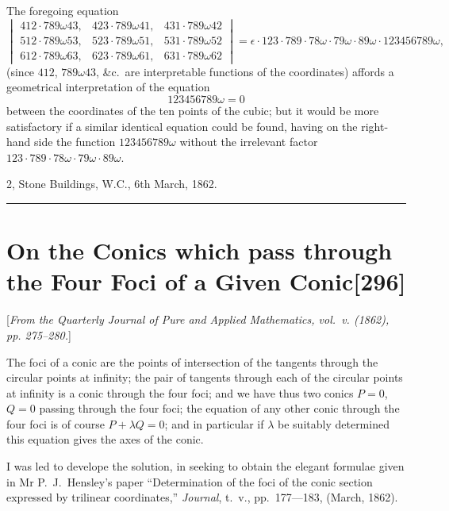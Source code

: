 \documentclass[11pt,a4paper]{article}
\newcommand{\paper}[2]{\section[#1]{#1\hfill\textnormal{[#2]}}}
\begin{document}
The foregoing equation
\[
\begin{vmatrix}
412 \cdot 789\omega 43, & 423 \cdot 789\omega 41, & 431 \cdot 789\omega 42\\
512 \cdot 789\omega 53, & 523 \cdot 789\omega 51, & 531 \cdot 789\omega 52\\
612 \cdot 789\omega 63, & 623 \cdot 789\omega 61, & 631 \cdot 789\omega 62
\end{vmatrix}
= \epsilon \cdot 123 \cdot 789 \cdot 78\omega \cdot 79\omega \cdot 89\omega \cdot 123456789\omega,
\]
(since $412$, $789\omega 43$, \&c.\ are interpretable functions of the coordinates) affords a geometrical interpretation of the equation
\[
123456789\omega = 0
\]
between the coordinates of the ten points of the cubic; but it would be more satisfactory if a similar identical equation could be found, having on the right-hand side the function $123456789\omega$ without the irrelevant factor $123 \cdot 789 \cdot 78\omega \cdot 79\omega \cdot 89\omega$.

\begin{flushright}
2, Stone Buildings, W.C., 6th March, 1862.
\end{flushright}

\vspace{1.5em}
\hrule
\vspace{1.5em}

\paper{On the Conics which pass through the Four Foci of a Given Conic}{296}

{\small
[\textit{From the Quarterly Journal of Pure and Applied Mathematics, vol.~v. (1862), pp. 275--280.}]
\par}
\vspace{0.5em}

\setcounter{page}{505}

The foci of a conic are the points of intersection of the tangents through the circular points at infinity; the pair of tangents through each of the circular points at infinity is a conic through the four foci; and we have thus two conics $P = 0$, $Q = 0$ passing through the four foci; the equation of any other conic through the four foci is of course $P + \lambda Q = 0$; and in particular if $\lambda$ be suitably determined this equation gives the axes of the conic.

I was led to develope the solution, in seeking to obtain the elegant formulae given in Mr P.~J.~Hensley's paper ``Determination of the foci of the conic section expressed by trilinear coordinates,'' \textit{Journal}, t.~v., pp.~177---183, (March, 1862).
\end{document}
